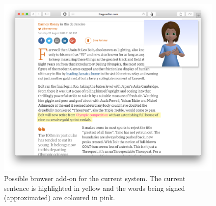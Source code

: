 \documentclass[12pt]{ociamthesis}  %
\begin{document}
\begin{figure}[H]
	\centering
    \includegraphics[scale=0.35]{chapter6/concept}
    \caption[Possible browser add-on for the current system]{Possible browser add-on for the current system. The current sentence is highlighted in yellow and the words being signed (approximated) are coloured in pink.}
    \label{fig:concept}
\end{figure}	
\end{document}
